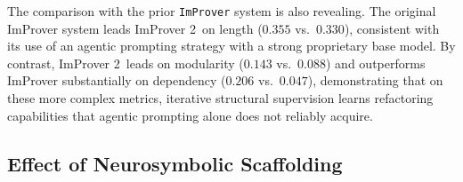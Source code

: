 The comparison with the prior \texttt{ImProver} system is also revealing. The original ImProver system leads ImProver 2\ on length ($0.355$ vs.\ $0.330$), consistent 
with its use of an agentic prompting strategy with a strong proprietary base model. By contrast, ImProver 2\ leads on modularity ($0.143$ vs.\ $0.088$) and outperforms ImProver substantially on dependency ($0.206$ vs.\ $0.047$), demonstrating that on these more complex metrics, iterative structural supervision learns refactoring capabilities that agentic prompting alone does not reliably acquire.



\subsection{Effect of Neurosymbolic Scaffolding}
\label{sec:scaffold_power}
\begin{table}[t]
\centering
\caption{\textbf{Scaffold Evaluations.} Effect of neurosymbolic scaffolding. Mean improvement at best@16 with and without the scaffold $\Psi$, across model families and metrics.}
\small
\setlength{\tabcolsep}{4pt}
\label{tab:scaffold}
\end{table}
